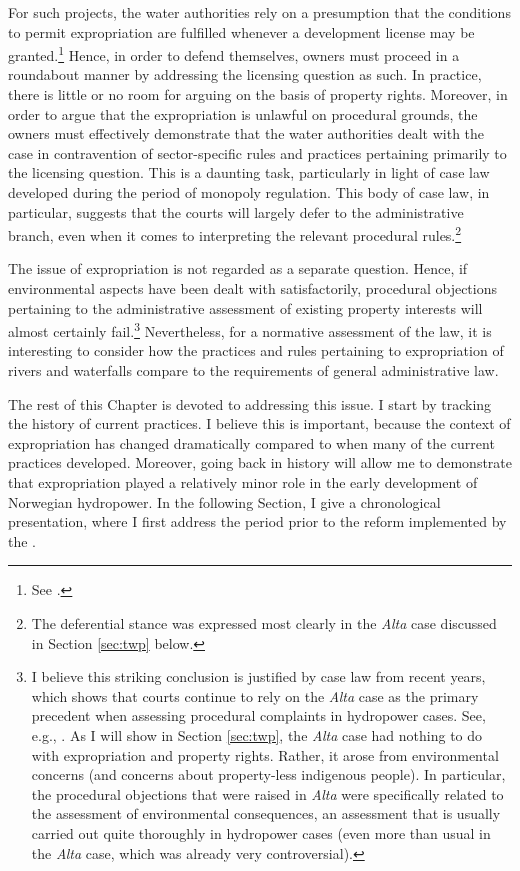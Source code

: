 For such projects, the water authorities rely on a presumption that the conditions to permit expropriation are fulfilled whenever a development license may be granted.\footnote{See \cite{flatby08}.} Hence, in order to defend themselves, owners must proceed in a roundabout manner by addressing the licensing question as such. In practice, there is little or no room for arguing on the basis of property rights. Moreover, in order to argue that the expropriation is unlawful on procedural grounds, the owners must effectively demonstrate that the water authorities dealt with the case in contravention of sector-specific rules and practices pertaining primarily to the licensing question. This is a daunting task, particularly in light of case law developed during the period of monopoly regulation. This body of case law, in particular, suggests that the courts will largely defer to the administrative branch, even when it comes to interpreting the relevant procedural rules.\footnote{The deferential stance was expressed most clearly in the {\it Alta} case discussed in Section \ref{sec:twp} below.}

The issue of expropriation is not regarded as a separate question. Hence, if environmental aspects have been dealt with satisfactorily, procedural objections pertaining to the administrative assessment of existing property interests will almost certainly fail.\footnote{I believe this striking conclusion is justified by case law from recent years, which shows that courts continue to rely on the {\it Alta} case as the primary precedent when assessing procedural complaints in hydropower cases. See, e.g., \cite{sauda09,jorpeland11}. As I will show in Section \ref{sec:twp}, the {\it Alta} case had nothing to do with expropriation and property rights. Rather, it arose from environmental concerns (and concerns about property-less indigenous people). In particular, the procedural objections that were raised in {\it Alta} were specifically related to the assessment of environmental consequences, an assessment that is usually carried out quite thoroughly  in hydropower cases (even more than usual in the {\it Alta} case, which was already very controversial).} Nevertheless, for a normative assessment of the law, it is interesting to consider how the practices and rules pertaining to expropriation of rivers and waterfalls compare to the requirements of general administrative law.

The rest of this Chapter is devoted to addressing this issue. I start by tracking the history of current practices. I believe this is important, because the context of expropriation has changed dramatically compared to when many of the current practices developed. Moreover, going back in history will allow me to demonstrate that expropriation played a relatively minor role in the early development of Norwegian hydropower. In the following Section, I give  a chronological presentation, where I first address the period prior to the reform implemented by the \cite{ea90}.

